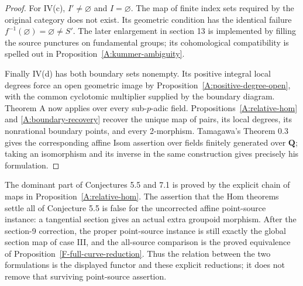 \begin{proof}
For IV(c), $I'\ne\varnothing$ and $I=\varnothing$. The map
of finite index sets required by the original category does not
exist. Its geometric condition has the identical failure
$f^{-1}(\varnothing)=\varnothing\ne S'$. The later enlargement
in section 13 is implemented by filling the source punctures
on fundamental groups; its cohomological compatibility is
spelled out in Proposition~\ref{A:kummer-ambiguity}.

Finally IV(d) has both boundary sets nonempty. Its positive
integral local degrees force an open geometric image by
Proposition~\ref{A:positive-degree-open}, with the common
cyclotomic multiplier supplied by the boundary diagram.
Theorem A now applies over every sub-$p$-adic field.
Propositions~\ref{A:relative-hom} and
\ref{A:boundary-recovery} recover the unique map of pairs,
its local degrees, its nonrational boundary points, and every
2-morphism. Tamagawa's Theorem 0.3 gives the corresponding
affine Isom assertion over fields finitely generated over
$\mathbf Q$; taking an isomorphism and its inverse in the
same construction gives precisely his formulation.
\end{proof}

\begin{remark}
\label{A:lead-one}
The dominant part of Conjectures 5.5 and 7.1 is proved by the
explicit chain of maps in Proposition~\ref{A:relative-hom}.
The assertion that the Hom theorems settle all of Conjecture 5.5
is false for the uncorrected affine point-source instance: a
tangential section gives an actual extra groupoid morphism.
After the section-9 correction, the proper point-source
instance is still exactly the global section map of case III,
and the all-source comparison is the proved equivalence of
Proposition~\ref{F-full-curve-reduction}. Thus the relation
between the two formulations is the displayed functor and
these explicit reductions; it does not remove that surviving
point-source assertion.
\end{remark}


